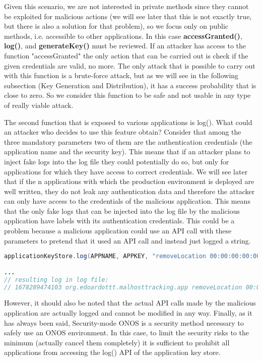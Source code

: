 Given this scenario, we are not interested in private methods since they cannot be exploited for malicious actions (we will see later that this is not exactly true, but there is also a solution for that problem), so we focus only on public methods, i.e. accessible to other applications. In this case \textbf{accessGranted()}, \textbf{log()}, and \textbf{generateKey()} must be reviewed.
If an attacker has access to the function "accessGranted" the only action that can be carried out is check if the given credentials are valid, no more. The only attack that is possible to carry out with this function is a brute-force attack, but as we will see in the following subsection (Key Generation and Distribution), it has a success probability that is close to zero. So we consider this function to be safe and not usable in any type of really viable attack.
\medskip

The second function that is exposed to various applications is log(). What could an attacker who decides to use this feature obtain? Consider that among the three mandatory parameters two of them are the authentication credentials (the application name and the security key). This means that if an attacker plans to inject fake logs into the log file they could potentially do so, but only for applications for which they have access to correct credentials. We will see later that if the n applications with which the production environment is deployed are well written, they do not leak any authentication data and therefore the attacker can only have access to the credentials of the malicious application. This means that the only fake logs that can be injected into the log file by the malicious application have labels with its authentication credentials. This could be a problem because a malicious application could use an API call with these parameters to pretend that it used an API call and instead just logged a string.
\begin{lstlisting}[language=Java]
applicationKeyStore.log(APPNAME, APPKEY, "removeLocation 00:00:00:00:00:04/None of:0000000000000002/1");

...
// resulting log in log file:
// 1678289474103 org.edoardottt.malhosttracking.app removeLocation 00:00:00:00:00:04/None of:0000000000000002/1
\end{lstlisting}
However, it should also be noted that the actual API calls made by the malicious application are actually logged and cannot be modified in any way.
Finally, as it has always been said, Security-mode ONOS is a security method necessary to safely use an ONOS environment. In this case, to limit the security risks to the minimum (actually cancel them completely) it is sufficient to prohibit all applications from accessing the log() API of the application key store.
\medskip

